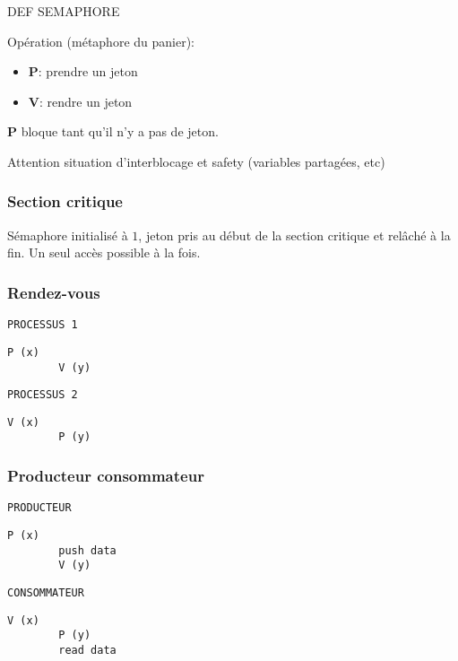 \documentclass[10pt,twocolumn,a4paper]{article}
\begin{document}
DEF SEMAPHORE

Opération (métaphore du panier): 
\begin{itemize} 
    \item \textbf{P}: prendre un jeton
    \item \textbf{V}: rendre un jeton
\end{itemize}

\textbf{P} bloque tant qu'il n'y a pas de jeton. 

Attention situation d'interblocage et safety (variables partagées, etc)

\subsubsection{Section critique}

Sémaphore initialisé à $1$, jeton pris au début de la section critique et relâché à la fin. Un seul accès possible à la fois. 

\subsubsection{Rendez-vous}

\begin{multicols}{2}
    \texttt{PROCESSUS 1}
    \begin{lstlisting}[xleftmargin=-1cm]
        P (x)
        V (y)
    \end{lstlisting}

    \columnbreak{}
    
    \texttt{PROCESSUS 2}
    \begin{lstlisting}[xleftmargin=-1cm]
        V (x)
        P (y)
    \end{lstlisting}
\end{multicols}

\subsubsection{Producteur consommateur}

\begin{multicols}{2}
    \texttt{PRODUCTEUR}
    \begin{lstlisting}[xleftmargin=-1cm]
        P (x) 
        push data
        V (y)
    \end{lstlisting}
    \columnbreak{}
    \texttt{CONSOMMATEUR}
    \hspace{0cm}
    \begin{lstlisting}[xleftmargin=-1cm]
        V (x) 
        P (y) 
        read data
    \end{lstlisting}
\end{multicols}
\end{document}
